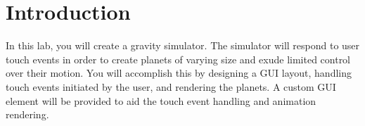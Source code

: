 \section{Introduction}

In this lab, you will create a gravity simulator.
The simulator will respond to user touch events in order to create planets of varying size and exude limited control over their motion.
You will accomplish this by designing a GUI layout, handling touch events initiated by the user, and rendering the planets.
A custom GUI element will be provided to aid the touch event handling and animation rendering.